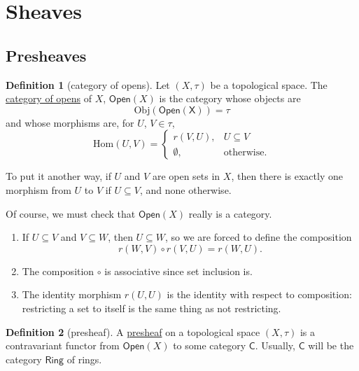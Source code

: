 \documentclass[a4paper]{report}
\newcommand{\defn}[1]{\ul{#1}}
\newcommand{\Obj}{\mathrm{Obj}}
\newcommand{\Hom}{\mathrm{Hom}}
\theoremstyle{definition}
\newtheorem{definition}{Definition}[section]
\theoremstyle{plain}
\theoremstyle{remark}
\begin{document}
\section{Sheaves}
\subsection{Presheaves}

\begin{definition}[category of opens] 
  \label{def:opencategory} 
  Let $(X, \tau)$ be a topological space. The \defn{category of opens} of $X$, $\mathsf{Open}(X)$ is the category whose objects are 
  \begin{equation*}
    \Obj(\mathsf{Open(X)}) = \tau 
  \end{equation*} and whose morphisms are, for $U$, $V \in \tau$, 
  \begin{equation*} 
    \Hom(U,V) =
    \begin{cases} 
      r(V,U), & U \subseteq V \\ 
      \emptyset, & \text{otherwise}.  
    \end{cases} 
  \end{equation*}

  To put it another way, if $U$ and $V$ are open sets in $X$, then there is exactly one morphism from $U$ to $V$ if $U \subseteq V$, and none otherwise.
\end{definition}

Of course, we must check that $\mathsf{Open}(X)$ really is a category.
\begin{enumerate} 
  \item If $U \subseteq V$ and $V \subseteq W$, then $U \subseteq W$, so we are forced to define the composition 
    \begin{equation*} 
      r(W,V) \circ r(V,U) = r(W,U).  
    \end{equation*} 
  \item The composition $\circ$ is associative since set inclusion is.

  \item The identity morphism $r(U,U)$ is the identity with respect to composition: restricting a set to itself is the same thing as not restricting.  
\end{enumerate}

\begin{definition}[presheaf] 
  \label{def:presheaf}
  A \defn{presheaf} on a topological space $(X,\tau)$ is a contravariant functor from $\mathsf{Open}(X)$ to some category $\mathsf{C}$. Usually, $\mathsf{C}$ will be the category $\mathsf{Ring}$ of rings.  
\end{definition}
\end{document}
